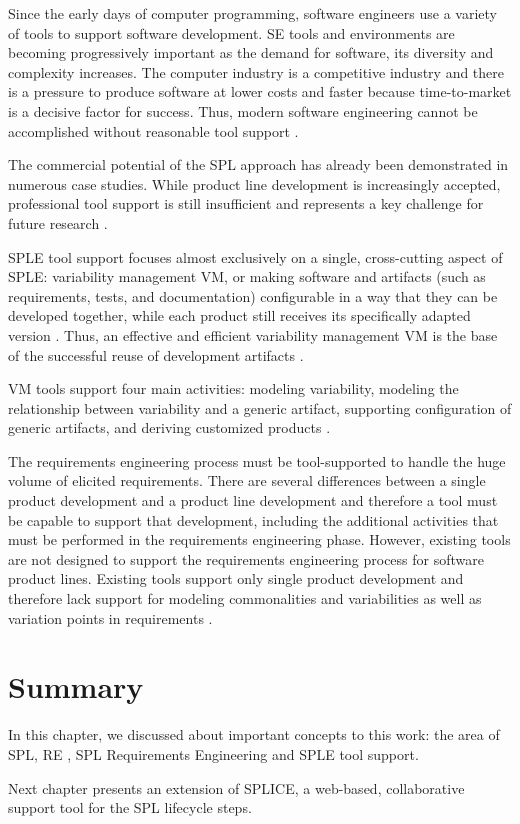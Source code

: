 Since the early days of computer programming, software engineers use a variety of tools to support 
software development. \acf{SE} tools and environments are becoming progressively
important as the demand for software, its diversity and complexity increases. The computer industry is a competitive 
industry and there is a pressure to produce software at lower costs and faster because time-to-market is a 
decisive factor for success. Thus, modern software engineering cannot be accomplished without reasonable 
tool support \citep{ossher2000software}.

The commercial potential of the \ac{SPL} approach has already been demonstrated in
numerous case studies. While product line development is increasingly accepted, professional 
tool support is still insufficient and represents a key challenge for future research 
\citep{Pohl2005,schmid2006requirements}.

\acf{SPLE} tool support focuses almost exclusively on a single, cross-cutting
aspect of \ac{SPLE}: variability management \ac{VM}, or making software and
artifacts (such as requirements, tests, and documentation) configurable in a way that they can be  developed together, while each 
product still receives its specifically adapted version \citep{schmid2013product}.  Thus, an effective 
and efficient variability management \ac{VM} is the base of the successful reuse of development 
artifacts \citep{boutkova2011experience}.

\acf{VM} tools support four main activities: modeling variability, modeling the
relationship between variability and a generic artifact, supporting configuration of generic artifacts, 
and deriving customized products \citep{schmid2013product}.

The requirements engineering process must be tool-supported to handle the huge
volume of elicited requirements. There are several differences between a single 
product development and a product line development and therefore a tool must be 
capable to support that development, including the additional activities that must be 
performed in the requirements engineering phase. However, existing tools are not designed 
to support the requirements engineering process for software product lines. Existing 
tools support only single product development and therefore lack support for modeling 
commonalities and variabilities as well as variation points in requirements
\citep{birk2003report}.

\section{Summary}
\label{sc:summary}

In this chapter, we discussed about important concepts to this work: the area of
\acf{SPL}, \acf{RE} , \ac{SPL} Requirements Engineering and \ac{SPLE} tool
support.

Next chapter presents an extension of \acf{SPLICE}, a web-based, collaborative
support tool for the \ac{SPL} lifecycle steps.

